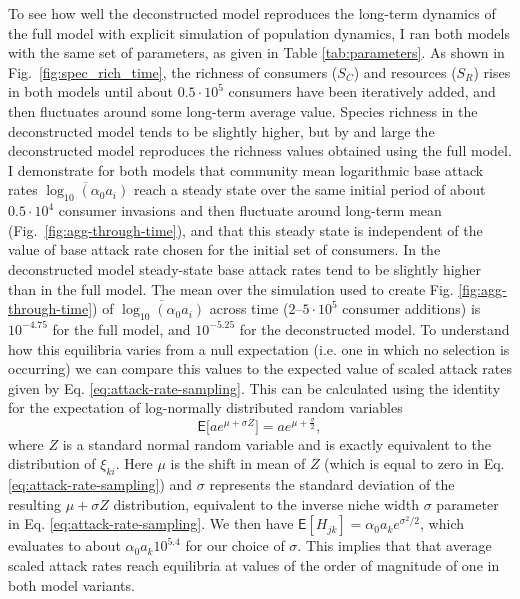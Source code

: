 \documentclass[a4paper]{report}
\DeclareMathOperator{\log}{log}
\begin{document}
To see how well the deconstructed model reproduces the long-term
dynamics of the full model with explicit simulation of population
dynamics, I ran both models with the same set of parameters, as given in
Table \ref{tab:parameters}. As shown in Fig.~\ref{fig:spec_rich_time},
the richness of consumers ($S_C$) and resources ($S_R$) rises in both
models until about $0.5\cdot 10^5$ consumers have been iteratively
added, and then fluctuates around some long-term average value.
Species richness in the deconstructed model tends to be slightly
higher, but by and large the deconstructed model reproduces the
richness values obtained using the full model.\\

 I demonstrate for both models that community mean logarithmic base attack rates
$\overline{\log_{10}(\alpha_0 a_{i})}$ reach a steady state over the
same initial period of about $0.5\cdot 10^4$ consumer invasions and then
fluctuate around long-term mean (Fig.~\ref{fig:agg-through-time}), and that this steady state is independent of the value of base attack rate chosen for the initial set of
consumers. In the deconstructed model steady-state base attack rates
tend to be slightly higher than in the full model. The mean over the simulation used to create Fig. \ref{fig:agg-through-time}) of
$\overline{\log_{10}(\alpha_0 a_{i})}$ across time
($2$--$5\cdot 10^{5}$ consumer additions) is
$10^{-4.75}$ for the full model, and $10^{-5.25}$ for the deconstructed model. To understand how this equilibria varies from a null expectation (i.e. one in which no selection is occurring) we can compare this values to the expected value of scaled attack rates given by
Eq. \eqref{eq:attack-rate-sampling}. This can be calculated using the identity for the expectation of log-normally distributed random variables
\begin{equation}
\mathsf{E}\big[a e^{\mu+\sigma Z}\big]=a e^{\mu+\frac{\sigma}{2}},
\end{equation}
where $Z$ is a standard normal random variable and is exactly equivalent to the distribution of $\xi_{ki}$. Here $\mu$ is the shift in mean of $Z$ (which is equal to zero in Eq. \eqref{eq:attack-rate-sampling}) and $\sigma$ represents the standard deviation of the resulting $\mu+\sigma Z$ distribution, equivalent to the inverse niche width $\sigma$ parameter in Eq. \eqref{eq:attack-rate-sampling}. We then have $\mathsf{E}[H_{jk}]= \alpha_0 a_k e^{\sigma^2/2}$, which evaluates to about $\alpha_0 a_k 10^{5.4}$ for our choice of $\sigma$. This implies
that that average scaled attack rates reach equilibria at values of
the order of magnitude of one in both model variants. \\
\end{document}
